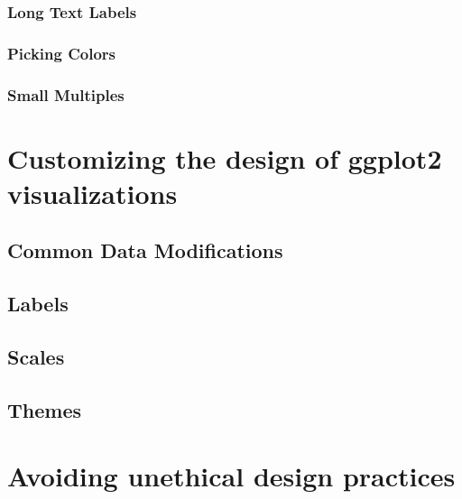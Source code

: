 \documentclass[
]{krantz}
\begin{document}
\hypertarget{long-text-labels}{%
\subsection{Long Text Labels}\label{long-text-labels}}

\hypertarget{picking-colors}{%
\subsection{Picking Colors}\label{picking-colors}}

\hypertarget{small-multiples}{%
\subsection{Small Multiples}\label{small-multiples}}

\hypertarget{customizing-visualization-design}{%
\chapter{Customizing the design of ggplot2 visualizations}\label{customizing-visualization-design}}

\hypertarget{common-data-modifications}{%
\section{Common Data Modifications}\label{common-data-modifications}}

\hypertarget{labels}{%
\section{Labels}\label{labels}}

\hypertarget{scales}{%
\section{Scales}\label{scales}}

\hypertarget{themes}{%
\section{Themes}\label{themes}}

\hypertarget{ethical-design-practices}{%
\chapter{Avoiding unethical design practices}\label{ethical-design-practices}}
\end{document}
